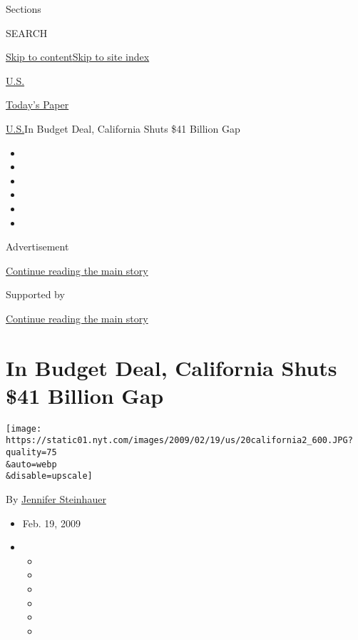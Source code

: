 Sections

SEARCH

\protect\hyperlink{site-content}{Skip to
content}\protect\hyperlink{site-index}{Skip to site index}

\href{https://www.nytimes.com/section/us}{U.S.}

\href{https://myaccount.nytimes.com/auth/login?response_type=cookie\&client_id=vi}{}

\href{https://www.nytimes.com/section/todayspaper}{Today's Paper}

\href{/section/us}{U.S.}\textbar{}In Budget Deal, California Shuts \$41
Billion Gap

\begin{itemize}
\item
\item
\item
\item
\item
\item
\end{itemize}

Advertisement

\protect\hyperlink{after-top}{Continue reading the main story}

Supported by

\protect\hyperlink{after-sponsor}{Continue reading the main story}

\hypertarget{in-budget-deal-california-shuts-41-billion-gap}{%
\section{In Budget Deal, California Shuts \$41 Billion
Gap}\label{in-budget-deal-california-shuts-41-billion-gap}}

\texttt{[image: https://static01.nyt.com/images/2009/02/19/us/20california2\_600.JPG?quality=75\\\&auto=webp\\\&disable=upscale]}

By \href{https://www.nytimes.com/by/jennifer-steinhauer}{Jennifer
Steinhauer}

\begin{itemize}
\item
  Feb. 19, 2009
\item
  \begin{itemize}
  \item
  \item
  \item
  \item
  \item
  \item
  \end{itemize}
\end{itemize}

